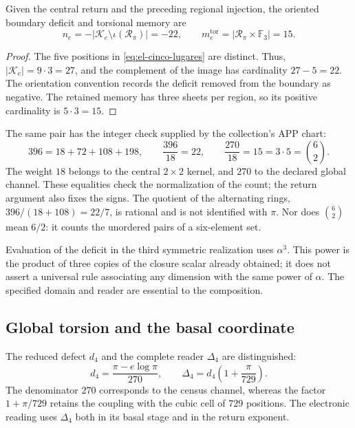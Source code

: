 \begin{proposition}
Given the central return and the preceding regional injection, the oriented
boundary deficit and torsional memory are
\begin{equation}
 n_e=-|\mathcal K_e\setminus\iota(\mathscr R_\pi)|=-22,
 \qquad
 m_e^{\mathrm{tor}}=|\mathscr R_\pi\times\mathbb F_3|=15.
 \label{eq:el-selector-enteros}
\end{equation}
\end{proposition}
\begin{proof}
The five positions in \eqref{eq:el-cinco-lugares} are distinct.
Thus, \(|\mathcal K_e|=9\cdot3=27\), and the complement of the image
has cardinality \(27-5=22\). The orientation convention records
the deficit removed from the boundary as negative. The retained memory has
three sheets per region, so its positive cardinality is
\(5\cdot3=15\).
\end{proof}

The same pair has the integer check supplied by the collection's APP chart:
\begin{equation}
 396=18+72+108+198,
 \qquad \frac{396}{18}=22,
 \qquad \frac{270}{18}=15=3\cdot5=\binom62.
 \label{eq:el-censo}
\end{equation}
The weight \(18\) belongs to the central \(2\times2\) kernel, and \(270\)
to the declared global channel. These equalities check the normalization
of the count; the return argument also fixes the signs. The
quotient of the alternating rings,
\(396/(18+108)=22/7\), is rational and is not identified with \(\pi\).
Nor does \(\binom62\) mean \(6/2\): it counts the unordered pairs
of a six-element set.

Evaluation of the deficit in the third symmetric realization uses
\(\alpha^3\). This power is the product of three copies of the
closure scalar already obtained; it does not assert a universal rule
associating any dimension with the same power of \(\alpha\).
The specified domain and reader are essential to the composition.

\subsection{Global torsion and the basal coordinate}

\begin{definition}
The reduced defect \(d_4\) and the complete reader
\(\Delta_4\) are distinguished:
\begin{equation}
 d_4=\frac{\pi-e\log\pi}{270},\qquad
 \Delta_4=d_4\left(1+\frac{\pi}{729}\right).
 \label{eq:el-delta}
\end{equation}
The denominator \(270\) corresponds to the census channel, whereas the
factor \(1+\pi/729\) retains the coupling with the cubic cell of
\(729\) positions. The electronic reading uses \(\Delta_4\) both in
its basal stage and in the return exponent.
\end{definition}

